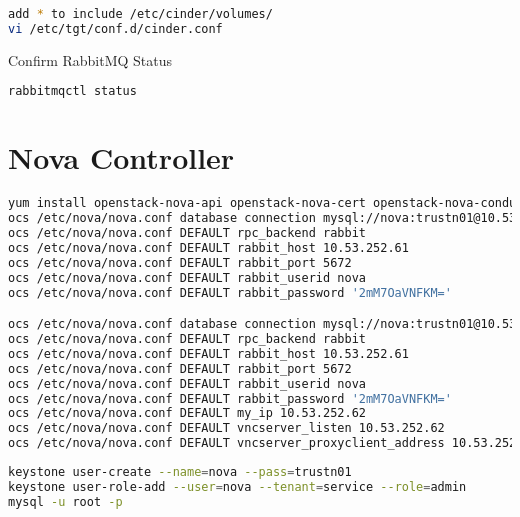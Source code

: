 \documentclass[11pt,letterpaper,oneside]{book}
\begin{document}
\begin{lstlisting}[caption={add * to include /etc/cinder/volumes/},language=bash]
add * to include /etc/cinder/volumes/
vi /etc/tgt/conf.d/cinder.conf
\end{lstlisting}


\begin{flushleft}
\begin{huge} \danger \end{huge} Confirm RabbitMQ Status
\end{flushleft}
\begin{lstlisting}[caption={},language=bash]
rabbitmqctl status
\end{lstlisting}

\chapter{Nova Controller}

\begin{lstlisting}[caption={},language=bash]
yum install openstack-nova-api openstack-nova-cert openstack-nova-conductor openstack-nova-console openstack-nova-novncproxy openstack-nova-scheduler python-novaclient
ocs /etc/nova/nova.conf database connection mysql://nova:trustn01@10.53.252.61/nova
ocs /etc/nova/nova.conf DEFAULT rpc_backend rabbit
ocs /etc/nova/nova.conf DEFAULT rabbit_host 10.53.252.61
ocs /etc/nova/nova.conf DEFAULT rabbit_port 5672
ocs /etc/nova/nova.conf DEFAULT rabbit_userid nova
ocs /etc/nova/nova.conf DEFAULT rabbit_password '2mM7OaVNFKM='

ocs /etc/nova/nova.conf database connection mysql://nova:trustn01@10.53.252.61/nova
ocs /etc/nova/nova.conf DEFAULT rpc_backend rabbit
ocs /etc/nova/nova.conf DEFAULT rabbit_host 10.53.252.61
ocs /etc/nova/nova.conf DEFAULT rabbit_port 5672
ocs /etc/nova/nova.conf DEFAULT rabbit_userid nova
ocs /etc/nova/nova.conf DEFAULT rabbit_password '2mM7OaVNFKM='
ocs /etc/nova/nova.conf DEFAULT my_ip 10.53.252.62
ocs /etc/nova/nova.conf DEFAULT vncserver_listen 10.53.252.62
ocs /etc/nova/nova.conf DEFAULT vncserver_proxyclient_address 10.53.252.62
\end{lstlisting}

\begin{lstlisting}[caption={virctlpaw001},language=bash]
keystone user-create --name=nova --pass=trustn01 
keystone user-role-add --user=nova --tenant=service --role=admin
mysql -u root -p
\end{lstlisting}
\end{document}
